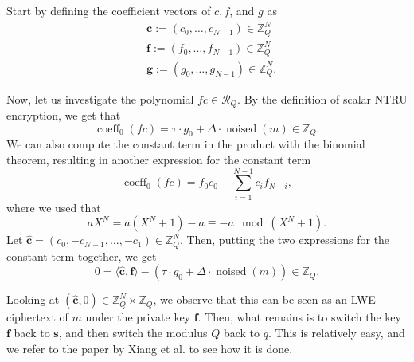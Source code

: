 Start by defining the coefficient vectors of $c, f$, and $g$ as
\begin{align*}
&\mathbf{c} :=(c_0, \ldots, c_{N-1}) \in \mathbb{Z}_Q^N \\
&\mathbf{f} := (f_0, \ldots, f_{N-1}) \in \mathbb{Z}_Q^N \\
&\mathbf{g} := (g_0, \ldots, g_{N-1}) \in \mathbb{Z}_Q^N.
\end{align*}

Now, let us investigate the polynomial $fc \in \mathcal{R}_Q$. By the definition of scalar NTRU encryption, we get that
$$\operatorname{coeff}_0(fc) = \tau \cdot g_0 + \Delta \cdot \operatorname{noised}(m) \in \mathbb{Z}_Q.$$
We can also compute the constant term in the product with the binomial theorem, resulting in another expression for the constant term
$$\operatorname{coeff}_0(fc) = f_0c_0 - \sum_{i=1}^{N-1}c_if_{N-i},$$
where we used that 
$$aX^N = a(X^N+1)-a \equiv -a \mod (X^N+1).$$
Let $\hat{\mathbf{c}} = (c_0, -c_{N-1}, \ldots, -c_1) \in \mathbb{Z}_Q^N$. Then, putting the two expressions for the constant term together, we get
$$0 = \langle \hat{\mathbf{c}}, \mathbf{f} \rangle - (\tau \cdot g_0 + \Delta \cdot \operatorname{noised}(m)) \in \mathbb{Z}_Q.$$

Looking at $(\hat{\mathbf{c}}, 0) \in \mathbb{Z}_Q^N \times \mathbb{Z}_Q$, we observe that this can be seen as an LWE ciphertext of $m$ under the private key $\mathbf{f}$. Then, what remains is to switch the key $\mathbf{f}$ back to $\mathbf{s}$, and then switch the modulus $Q$ back to $q$. This is relatively easy, and we refer to the paper by Xiang et al. \cite{cite:fast_bootstrap_crypto23} to see how it is done.